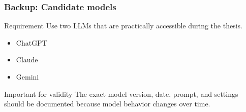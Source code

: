 \begin{frame}
\frametitle{Backup: Candidate models}

\begin{block}{Requirement}
Use two LLMs that are practically accessible during the thesis.
\end{block}

\begin{itemize}
    \item ChatGPT
    \item Claude
    \item Gemini
\end{itemize}

\bigskip

\begin{alertblock}{Important for validity}
The exact model version, date, prompt, and settings should be documented because model behavior changes over time.
\end{alertblock}

\end{frame}

